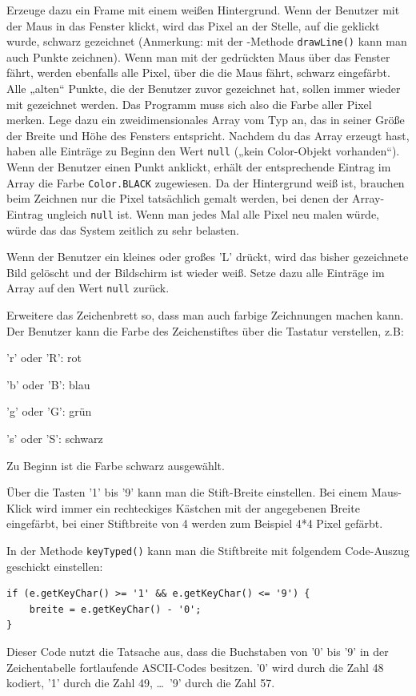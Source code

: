 \begin{compactenum}[a)]
\item Erzeuge dazu ein Frame mit einem weißen Hintergrund. Wenn der Benutzer
mit der Maus in das Fenster klickt, wird das Pixel an der Stelle, auf die
geklickt wurde, schwarz gezeichnet (Anmerkung: mit der
-Methode \lstinline|drawLine()| kann man auch Punkte
zeichnen). Wenn man mit der gedrückten Maus über das Fenster fährt, werden
ebenfalls alle Pixel, über die die Maus fährt, schwarz eingefärbt. Alle „alten“
Punkte, die der Benutzer zuvor gezeichnet hat, sollen immer wieder mit
gezeichnet werden. Das Programm muss sich also die Farbe aller Pixel merken.
Lege dazu ein zweidimensionales Array vom Typ  an, das in seiner
Größe der Breite und Höhe des Fensters entspricht. Nachdem du das Array erzeugt
hast, haben alle Einträge zu Beginn den Wert \lstinline|null| („kein
Color-Objekt vorhanden“). Wenn der Benutzer einen Punkt anklickt, erhält der
entsprechende Eintrag im Array die Farbe \lstinline|Color.BLACK| zugewiesen. Da
der Hintergrund weiß ist, brauchen beim Zeichnen nur die Pixel tatsächlich
gemalt werden, bei denen der Array-Eintrag ungleich \lstinline|null| ist. Wenn
man jedes Mal alle Pixel neu malen würde, würde das das System zeitlich zu sehr
belasten.

\item Wenn der Benutzer ein kleines oder großes ’L’ drückt, wird das bisher
gezeichnete Bild gelöscht und der Bildschirm ist wieder weiß. Setze dazu alle
Einträge im Array auf den Wert \lstinline|null| zurück.

\item Erweitere das Zeichenbrett so, dass man auch farbige Zeichnungen machen
kann. Der Benutzer kann die Farbe des Zeichenstiftes über die Tastatur
verstellen, z.B:

’r’ oder ’R’: rot

’b’ oder ’B’: blau

’g’ oder ’G’: grün

’s’ oder ’S’: schwarz

Zu Beginn ist die Farbe schwarz ausgewählt. 

\item Über die Tasten ’1’ bis ’9’ kann man die Stift-Breite einstellen. Bei
einem Maus-Klick wird immer ein rechteckiges Kästchen mit der angegebenen
Breite eingefärbt, bei einer Stiftbreite von 4 werden zum Beispiel 4*4 Pixel
gefärbt.

In der Methode \lstinline|keyTyped()| kann man die Stiftbreite mit folgendem
Code-Auszug geschickt einstellen:

\begin{lstlisting}
if (e.getKeyChar() >= '1' && e.getKeyChar() <= '9') {
    breite = e.getKeyChar() - '0';
}
\end{lstlisting}

Dieser Code nutzt die Tatsache aus, dass die Buchstaben von ’0’ bis ’9’ in der
Zeichentabelle fortlaufende ASCII-Codes besitzen. ’0’ wird durch die Zahl 48
kodiert, ’1’ durch die Zahl 49, \ldots\ ’9’ durch die Zahl 57.
\end{compactenum}


